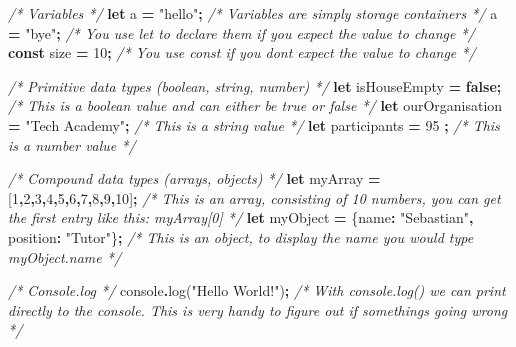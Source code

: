 \documentclass[
]{book}
\newenvironment{Shaded}{\begin{snugshade}}{\end{snugshade}}
\newcommand{\BuiltInTok}[1]{#1}
\newcommand{\CommentTok}[1]{\textcolor[rgb]{0.56,0.35,0.01}{\textit{#1}}}
\newcommand{\DataTypeTok}[1]{\textcolor[rgb]{0.13,0.29,0.53}{#1}}
\newcommand{\DecValTok}[1]{\textcolor[rgb]{0.00,0.00,0.81}{#1}}
\newcommand{\FunctionTok}[1]{\textcolor[rgb]{0.00,0.00,0.00}{#1}}
\newcommand{\KeywordTok}[1]{\textcolor[rgb]{0.13,0.29,0.53}{\textbf{#1}}}
\newcommand{\NormalTok}[1]{#1}
\newcommand{\OperatorTok}[1]{\textcolor[rgb]{0.81,0.36,0.00}{\textbf{#1}}}
\newcommand{\StringTok}[1]{\textcolor[rgb]{0.31,0.60,0.02}{#1}}
\begin{document}
\begin{Shaded}
\begin{Highlighting}[]
\CommentTok{/* Variables */}
\KeywordTok{let}\NormalTok{ a }\OperatorTok{=} \StringTok{"hello"}\OperatorTok{;} \CommentTok{/* Variables are simply storage containers */}
\NormalTok{a }\OperatorTok{=} \StringTok{"bye"}\OperatorTok{;}       \CommentTok{/* You use let to declare them if you expect the value to change */}
\KeywordTok{const}\NormalTok{ size }\OperatorTok{=} \DecValTok{10}\OperatorTok{;} \CommentTok{/* You use const if you dont expect the value to change */}

\CommentTok{/* Primitive data types (boolean, string, number) */}
\KeywordTok{let}\NormalTok{ isHouseEmpty }\OperatorTok{=} \KeywordTok{false}\OperatorTok{;}             \CommentTok{/* This is a boolean value and can either be true or false */}
\KeywordTok{let}\NormalTok{ ourOrganisation }\OperatorTok{=} \StringTok{"Tech Academy"}\OperatorTok{;} \CommentTok{/* This is a string value */}
\KeywordTok{let}\NormalTok{ participants }\OperatorTok{=} \DecValTok{95}  \OperatorTok{;}              \CommentTok{/* This is a number value */}

\CommentTok{/* Compound data types (arrays, objects) */}
\KeywordTok{let}\NormalTok{ myArray }\OperatorTok{=}\NormalTok{ [}\DecValTok{1}\OperatorTok{,}\DecValTok{2}\OperatorTok{,}\DecValTok{3}\OperatorTok{,}\DecValTok{4}\OperatorTok{,}\DecValTok{5}\OperatorTok{,}\DecValTok{6}\OperatorTok{,}\DecValTok{7}\OperatorTok{,}\DecValTok{8}\OperatorTok{,}\DecValTok{9}\OperatorTok{,}\DecValTok{10}\NormalTok{]}\OperatorTok{;}                  \CommentTok{/* This is an array, consisting of 10 numbers, you can get the first entry like this: myArray[0] */}
\KeywordTok{let}\NormalTok{ myObject }\OperatorTok{=}\NormalTok{ \{}\DataTypeTok{name}\OperatorTok{:} \StringTok{"Sebastian"}\OperatorTok{,} \DataTypeTok{position}\OperatorTok{:} \StringTok{"Tutor"}\NormalTok{\}}\OperatorTok{;} \CommentTok{/* This is an object, to display the name you would type myObject.name */}

\CommentTok{/* Console.log */}
\BuiltInTok{console}\OperatorTok{.}\FunctionTok{log}\NormalTok{(}\StringTok{"Hello World!"}\NormalTok{)}\OperatorTok{;} \CommentTok{/* With console.log() we can print directly to the console. This is very handy to figure out if something\textquotesingle{}s going wrong */}


\end{Highlighting}
\end{Shaded}
\end{document}
